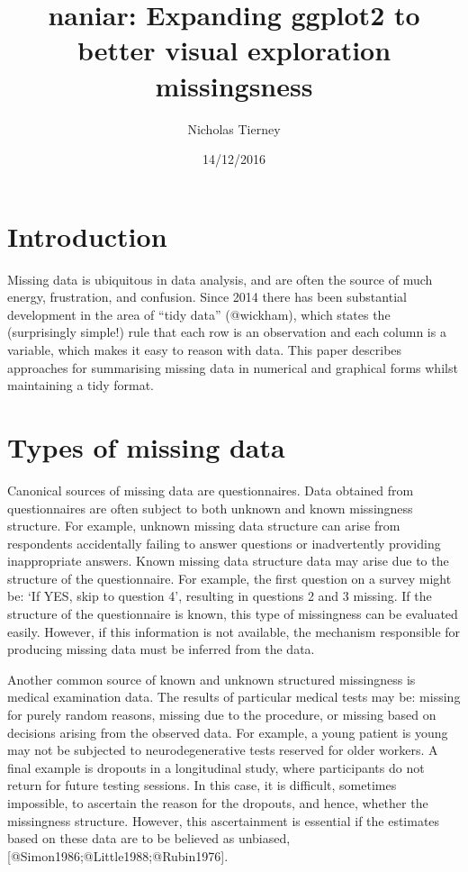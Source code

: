 \documentclass[]{article}
\title{naniar: Expanding ggplot2 to better visual exploration missingsness}
\author{Nicholas Tierney}
\date{14/12/2016}
\begin{document}
\maketitle

\section{Introduction}\label{introduction}

Missing data is ubiquitous in data analysis, and are often the source of
much energy, frustration, and confusion. Since 2014 there has been
substantial development in the area of ``tidy data'' (@wickham), which
states the (surprisingly simple!) rule that each row is an observation
and each column is a variable, which makes it easy to reason with data.
This paper describes approaches for summarising missing data in
numerical and graphical forms whilst maintaining a tidy format.

\section{Types of missing data}\label{types-of-missing-data}

Canonical sources of missing data are questionnaires. Data obtained from
questionnaires are often subject to both unknown and known missingness
structure. For example, unknown missing data structure can arise from
respondents accidentally failing to answer questions or inadvertently
providing inappropriate answers. Known missing data structure data may
arise due to the structure of the questionnaire. For example, the first
question on a survey might be: `If YES, skip to question 4', resulting
in questions 2 and 3 missing. If the structure of the questionnaire is
known, this type of missingness can be evaluated easily. However, if
this information is not available, the mechanism responsible for
producing missing data must be inferred from the data.

Another common source of known and unknown structured missingness is
medical examination data. The results of particular medical tests may
be: missing for purely random reasons, missing due to the procedure, or
missing based on decisions arising from the observed data. For example,
a young patient is young may not be subjected to neurodegenerative tests
reserved for older workers. A final example is dropouts in a
longitudinal study, where participants do not return for future testing
sessions. In this case, it is difficult, sometimes impossible, to
ascertain the reason for the dropouts, and hence, whether the
missingness structure. However, this ascertainment is essential if the
estimates based on these data are to be believed as unbiased,
{[}@Simon1986;@Little1988;@Rubin1976{]}.
\end{document}
